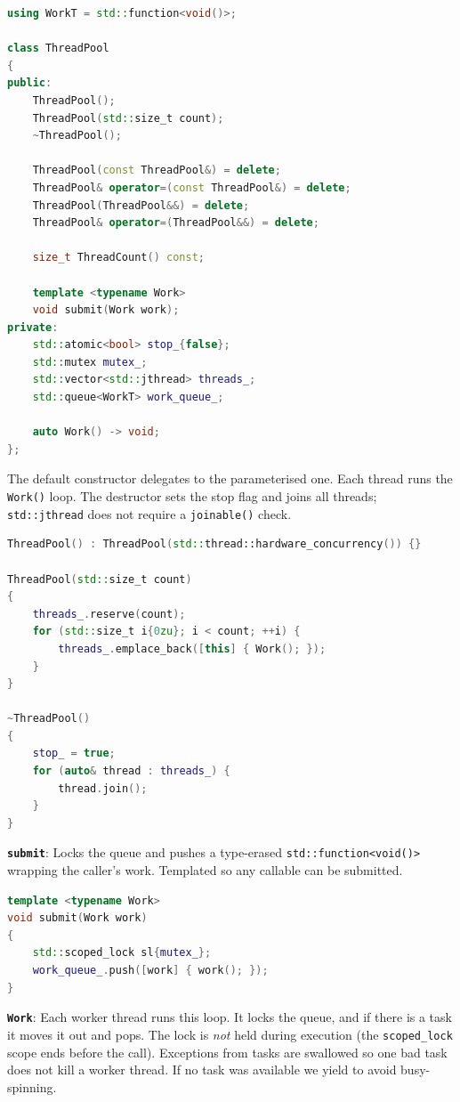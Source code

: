 \documentclass{article}
\begin{document}
\begin{lstlisting}[language=cpp,caption={ThreadPool skeleton}]
using WorkT = std::function<void()>;

class ThreadPool
{
public:
    ThreadPool();
    ThreadPool(std::size_t count);
    ~ThreadPool();

    ThreadPool(const ThreadPool&) = delete;
    ThreadPool& operator=(const ThreadPool&) = delete;
    ThreadPool(ThreadPool&&) = delete;
    ThreadPool& operator=(ThreadPool&&) = delete;

    size_t ThreadCount() const;

    template <typename Work>
    void submit(Work work);
private:
    std::atomic<bool> stop_{false};
    std::mutex mutex_;
    std::vector<std::jthread> threads_;
    std::queue<WorkT> work_queue_;

    auto Work() -> void;
};
\end{lstlisting}

The default constructor delegates to the parameterised one. Each thread runs the \texttt{Work()} loop. The destructor sets the stop flag and joins all threads; \texttt{std::jthread} does not require a \texttt{joinable()} check.

\begin{lstlisting}[language=cpp,caption={ThreadPool constructors and destructor}]
ThreadPool() : ThreadPool(std::thread::hardware_concurrency()) {}

ThreadPool(std::size_t count)
{
    threads_.reserve(count);
    for (std::size_t i{0zu}; i < count; ++i) {
        threads_.emplace_back([this] { Work(); });
    }
}

~ThreadPool()
{
    stop_ = true;
    for (auto& thread : threads_) {
        thread.join();
    }
}
\end{lstlisting}

\textbf{\texttt{submit}}: Locks the queue and pushes a type-erased \texttt{std::function<void()>} wrapping the caller's work. Templated so any callable can be submitted.

\begin{lstlisting}[language=cpp,caption={ThreadPool::submit}]
template <typename Work>
void submit(Work work)
{
    std::scoped_lock sl{mutex_};
    work_queue_.push([work] { work(); });
}
\end{lstlisting}

\textbf{\texttt{Work}}: Each worker thread runs this loop. It locks the queue, and if there is a task it moves it out and pops. The lock is \emph{not} held during execution (the \texttt{scoped\_lock} scope ends before the call). Exceptions from tasks are swallowed so one bad task does not kill a worker thread. If no task was available we yield to avoid busy-spinning.
\end{document}
